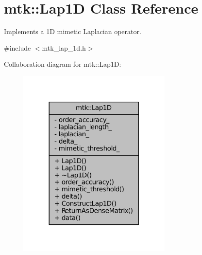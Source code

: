 \hypertarget{classmtk_1_1Lap1D}{\section{mtk\+:\+:Lap1\+D Class Reference}
\label{classmtk_1_1Lap1D}
}


Implements a 1\+D mimetic Laplacian operator.  




{\ttfamily \#include $<$mtk\+\_\+lap\+\_\+1d.\+h$>$}



Collaboration diagram for mtk\+:\+:Lap1\+D\+:\nopagebreak
\begin{figure}[H]
\begin{center}
\leavevmode
\includegraphics[width=218pt]{classmtk_1_1Lap1D__coll__graph}
\end{center}
\end{figure}
